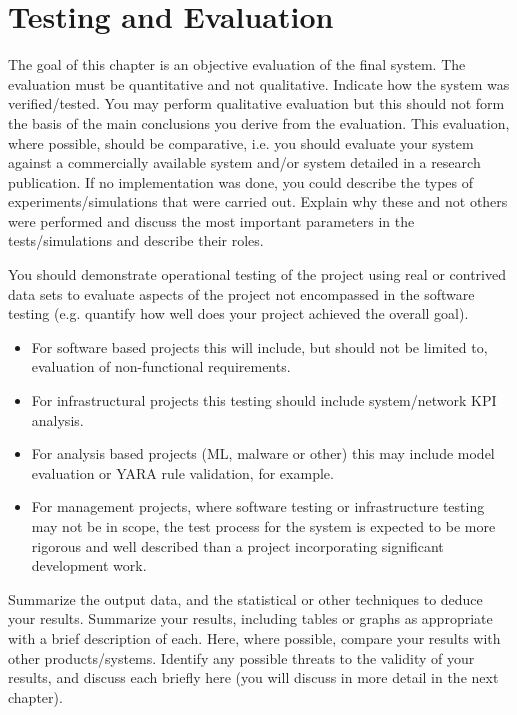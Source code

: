 \chapter{Testing and Evaluation}
\label{chap:eval}

The goal of this chapter is an objective evaluation of the final system. The evaluation must be quantitative and not qualitative. Indicate how the system was verified/tested. You may perform qualitative evaluation but this should not form the basis of the main conclusions you derive from the evaluation. This evaluation, where possible, should be comparative, i.e. you should evaluate your system against a commercially available system and/or system detailed in a research publication. If no implementation was done, you could describe the types of experiments/simulations that were carried out. Explain why these and not others were performed and discuss the most important parameters in the tests/simulations and describe their roles.

You should demonstrate operational testing of the project using real or contrived data sets to evaluate aspects of the project not encompassed in the software testing (e.g. quantify how well does your project achieved the overall goal). 
\begin{itemize}
    \item For software based projects this will include, but should not be limited to, evaluation of non-functional requirements.
    \item For infrastructural projects this testing should include system/network KPI analysis.
    \item For analysis based projects (ML, malware or other) this may include model evaluation or YARA rule validation, for example.
    \item For management projects, where software testing or infrastructure testing may not be in scope, the test process for the system is expected to be more rigorous and well described than a project incorporating significant development work.
\end{itemize} 

Summarize the output data, and the statistical or other techniques to deduce your results. Summarize your results, including tables or graphs as appropriate with a brief description of each. Here, where possible, compare your results with other products/systems. Identify any possible threats to the validity of your results, and discuss each briefly here (you will discuss in more detail in the next chapter).